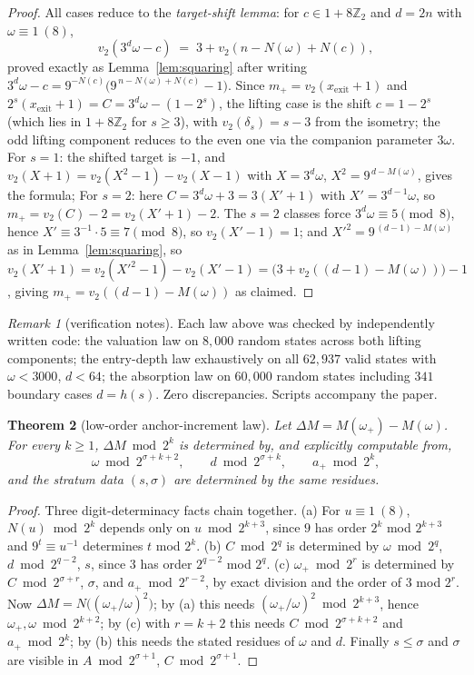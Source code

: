 \documentclass[11pt]{article}
\newtheorem{theorem}{Theorem}[section]
\theoremstyle{remark}
\newtheorem{remark}[theorem]{Remark}
\newcommand{\Z}{\mathbb{Z}}
\newcommand{\vt}[1]{v_2\!\left(#1\right)}
\newcommand{\w}{\omega}
\newcommand{\wnext}{\w_{+}}
\begin{document}
\begin{proof}
All cases reduce to the \emph{target-shift lemma}: for $c \in 1 + 8\Z_2$ and $d = 2n$ with $\w \equiv 1\ (8)$,
\[ \vt{3^{d}\w - c} \;=\; 3 + \vt{n - N(\w) + N(c)}, \]
proved exactly as Lemma~\ref{lem:squaring} after writing $3^d\w - c = 9^{-N(c)}\bigl(9^{\,n - N(\w) + N(c)} - 1\bigr)$. Since $m_+ = \vt{x_{\mathrm{exit}}+1}$ and $2^s(x_{\mathrm{exit}}+1) = C = 3^d\w - (1 - 2^s)$, the lifting case is the shift $c = 1 - 2^s$ (which lies in $1+8\Z_2$ for $s \ge 3$), with $\vt{\delta_s} = s - 3$ from the isometry; the odd lifting component reduces to the even one via the companion parameter $3\w$. For $s = 1$: the shifted target is $-1$, and $\vt{X+1} = \vt{X^2-1} - \vt{X-1}$ with $X = 3^d\w$, $X^2 = 9^{\,d - M(\w)}$, gives the formula; For $s = 2$: here $C = 3^d\w + 3 = 3(X' + 1)$ with $X' = 3^{d-1}\w$, so $m_+ = \vt{C} - 2 = \vt{X'+1} - 2$. The $s=2$ classes force $3^d\w \equiv 5 \pmod 8$, hence $X' \equiv 3^{-1}\cdot 5 \equiv 7 \pmod 8$, so $\vt{X'-1} = 1$; and $X'^2 = 9^{\,(d-1) - M(\w)}$ as in Lemma~\ref{lem:squaring}, so $\vt{X'+1} = \vt{X'^2-1} - \vt{X'-1} = \bigl(3 + \vt{(d-1) - M(\w)}\bigr) - 1$, giving $m_+ = \vt{(d-1) - M(\w)}$ as claimed.
\end{proof}

\begin{remark}[verification notes]\label{rem:verify1}
Each law above was checked by independently written code: the valuation law on $8{,}000$ random states across both lifting components; the entry-depth law exhaustively on all $62{,}937$ valid states with $\w < 3000$, $d < 64$; the absorption law on $60{,}000$ random states including $341$ boundary cases $d = h(s)$. Zero discrepancies. Scripts accompany the paper.
\end{remark}

\begin{theorem}[low-order anchor-increment law]\label{thm:deltaM}
Let $\Delta M = M(\wnext) - M(\w)$. For every $k \ge 1$, $\Delta M \bmod 2^k$ is determined by, and explicitly computable from,
\[ \w \bmod 2^{\sigma + k + 2},\qquad d \bmod 2^{\sigma + k},\qquad a_+ \bmod 2^k, \]
and the stratum data $(s, \sigma)$ are determined by the same residues.
\end{theorem}

\begin{proof}
Three digit-determinacy facts chain together. (a) For $u \equiv 1\ (8)$, $N(u) \bmod 2^k$ depends only on $u \bmod 2^{k+3}$, since $9$ has order $2^k$ mod $2^{k+3}$ and $9^t \equiv u^{-1}$ determines $t$ mod $2^k$. (b) $C \bmod 2^{q}$ is determined by $\w \bmod 2^q$, $d \bmod 2^{q-2}$, $s$, since $3$ has order $2^{q-2}$ mod $2^q$. (c) $\wnext \bmod 2^r$ is determined by $C \bmod 2^{\sigma + r}$, $\sigma$, and $a_+ \bmod 2^{r-2}$, by exact division and the order of $3$ mod $2^r$. Now $\Delta M = N\bigl((\wnext/\w)^2\bigr)$; by (a) this needs $(\wnext/\w)^2 \bmod 2^{k+3}$, hence $\wnext, \w \bmod 2^{k+2}$; by (c) with $r = k+2$ this needs $C \bmod 2^{\sigma+k+2}$ and $a_+ \bmod 2^k$; by (b) this needs the stated residues of $\w$ and $d$. Finally $s \le \sigma$ and $\sigma$ are visible in $A \bmod 2^{\sigma+1}$, $C \bmod 2^{\sigma+1}$.
\end{proof}
\end{document}
